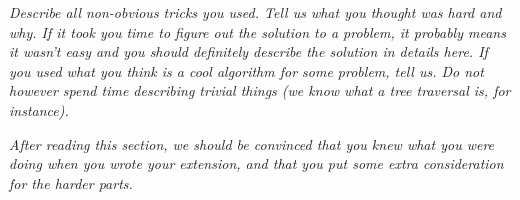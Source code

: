 \emph{Describe all non-obvious tricks you used. Tell us what you thought was hard and
why. If it took you time to figure out the solution to a problem, it probably
means it wasn't easy and you should definitely describe the solution in details
here. If you used what you think is a cool algorithm for some problem, tell us.
Do not however spend time describing trivial things (we know what a tree traversal
is, for instance).}

\emph{After reading this section, we should be convinced that you knew what you were
doing when you wrote your extension, and that you put some extra consideration
for the harder parts.}
